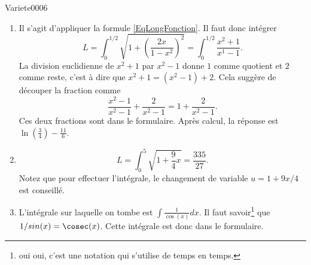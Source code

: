 
\begin{corrige}{Variete0006}

	\begin{enumerate}
		\item
			Il s'agit d'appliquer la formule \eqref{EqLongFonction}. Il faut donc intégrer
			\begin{equation}
				L=\int_0^{1/2}\sqrt{1+\left( \frac{ 2x }{ 1-x^2 } \right)^2}=\int_0^{1/2}\frac{ x^2+1 }{ x^1-1 }.
			\end{equation}
			La division euclidienne de $x^2+1$ par $x^2-1$ donne $1$ comme quotient et $2$ comme reste, c'est à dire que $x^2+1=(x^2-1)+2$. Cela suggère de découper la fraction comme
			\begin{equation}
				\frac{ x^2-1 }{ x^2-1 }+\frac{ 2 }{ x^2-1 }=1+\frac{ 2 }{ x^2-1 }.
			\end{equation}
			Ces deux fractions sont dans le formulaire. Après calcul, la réponse est $\ln(\frac{ 3 }{ 4 })-\frac{ 11 }{ 6 }$.

		\item
			\begin{equation}
				L=\int_0^5\sqrt{1+\frac{ 9 }{ 4 }x}=\frac{ 335 }{ 27 }.
			\end{equation}
			Notez que pour effectuer l'intégrale, le changement de variable $u=1+9x/4$ est conseillé.

		\item
			L'intégrale sur laquelle on tombe est $\int\frac{1}{ \cos(x) }dx$. Il faut savoir\footnote{oui oui, c'est une notation qui s'utilise de temps en temps.} que $1/sin(x)=\cosec(x)$. Cette intégrale est donc dans le formulaire.
			

	\end{enumerate}
	

\end{corrige}
